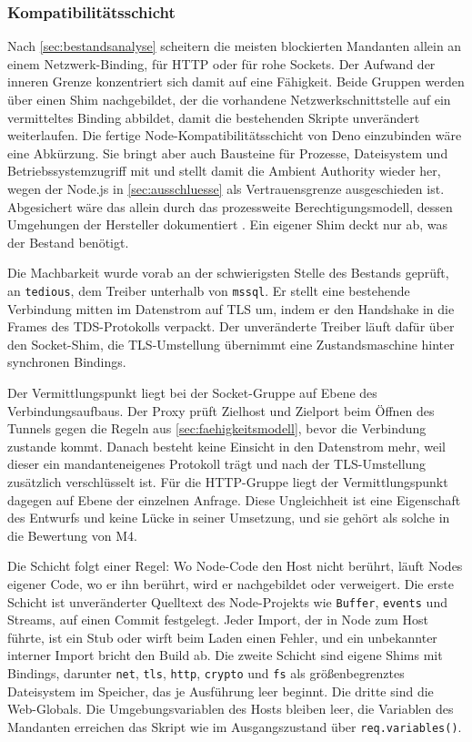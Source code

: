 \subsubsection{Kompatibilitätsschicht}
\label{sec:kompatibilitaetsschicht}

Nach \autoref{sec:bestandsanalyse} scheitern die meisten blockierten Mandanten allein an einem Netzwerk-Binding, für
\ac{HTTP} oder für rohe Sockets. Der Aufwand der inneren Grenze konzentriert sich
damit auf eine Fähigkeit. Beide Gruppen werden über einen Shim nachgebildet, der die vorhandene Netzwerkschnittstelle
auf ein vermitteltes Binding abbildet, damit die bestehenden Skripte unverändert weiterlaufen. Die fertige
Node-Kompatibilitätsschicht von Deno einzubinden wäre eine Abkürzung. Sie bringt aber auch Bausteine für
Prozesse, Dateisystem und Betriebssystemzugriff mit und stellt damit die Ambient Authority wieder her, wegen der
Node.js in \autoref{sec:ausschluesse} als Vertrauensgrenze ausgeschieden ist. Abgesichert wäre das allein durch das
prozessweite Berechtigungsmodell, dessen Umgehungen der Hersteller dokumentiert
\autocite{the_deno_authors_security_2026}. Ein eigener Shim deckt nur ab, was der Bestand benötigt.

Die Machbarkeit wurde vorab an der schwierigsten Stelle des Bestands geprüft, an \texttt{tedious}, dem Treiber
unterhalb von \texttt{mssql}. Er stellt eine bestehende Verbindung mitten im Datenstrom auf \ac{TLS} um, indem er den
Handshake in die Frames des \ac{TDS}-Protokolls verpackt. Der unveränderte Treiber läuft dafür über den Socket-Shim,
die \ac{TLS}-Umstellung übernimmt eine Zustandsmaschine hinter synchronen Bindings.

Der Vermittlungspunkt liegt bei der Socket-Gruppe auf Ebene des Verbindungsaufbaus. Der Proxy prüft Zielhost und
Zielport beim Öffnen des Tunnels gegen die Regeln aus \autoref{sec:faehigkeitsmodell}, bevor die Verbindung zustande kommt. Danach besteht
keine Einsicht in den Datenstrom mehr, weil dieser ein mandanteneigenes Protokoll trägt und nach der
\ac{TLS}-Umstellung zusätzlich verschlüsselt ist. Für die \ac{HTTP}-Gruppe liegt der Vermittlungspunkt dagegen auf
Ebene der einzelnen Anfrage. Diese Ungleichheit ist eine Eigenschaft des Entwurfs und keine Lücke in seiner
Umsetzung, und sie gehört als solche in die Bewertung von M4.

Die Schicht folgt einer Regel: Wo Node-Code den Host nicht berührt, läuft Nodes eigener Code, wo er ihn berührt,
wird er nachgebildet oder verweigert. Die erste Schicht ist unveränderter Quelltext des Node-Projekts wie
\texttt{Buffer}, \texttt{events} und Streams, auf einen Commit festgelegt. Jeder Import, der in Node zum Host führte,
ist ein Stub oder wirft beim Laden einen Fehler, und ein unbekannter interner Import bricht den Build ab. Die zweite Schicht sind
eigene Shims mit Bindings, darunter \texttt{net}, \texttt{tls}, \texttt{http}, \texttt{crypto} und \texttt{fs} als
größenbegrenztes Dateisystem im Speicher, das je Ausführung leer beginnt. Die dritte sind die Web-Globals. Die
Umgebungsvariablen des Hosts bleiben leer, die Variablen des Mandanten erreichen das Skript wie im Ausgangszustand über
\texttt{req.variables()}.

